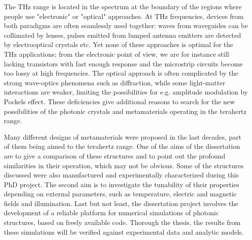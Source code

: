 \documentclass[letterpaper,12pt]{report}
\begin{document}
The THz range is located in the spectrum at the boundary of the regions where people use "electronic" or "optical" approaches. At THz frequencies, devices from both paradigms are often seamlessly used together: waves from waveguides can be collimated by lenses, pulses emitted from lumped antenna emitters are detected by electrooptical crystals etc. Yet none of these approaches is optimal for the THz applications; from the electronic point of view, we are for instance still lacking transistors with fast enough response and the microstrip circuits become too lossy at high frequencies. The optical approach is often complicated by the strong wave-optics phenomena such as diffraction, while some light-matter interactions are weaker, limiting the possibilities for e.g. amplitude modulation by Pockels effect. These deficiencies give additional reasons to search for the new possibilities of the photonic crystals and metamaterials operating in the terahertz range.



Many different designs of metamaterials  %
were proposed in the last decades, part of them being aimed to the terahertz range. %
One of the aims of the dissertation are to give a comparison of these structures and to point out the profound similarities in their operation, which may not be obvious.  Some of the structures discussed were also manufactured and experimentally characterized during this PhD project. 
The second aim is to investigate the tunability of their properties depending on external parameters, such as temperature, electric and magnetic fields and illumination. %
Last but not least, the dissertation project involves the development of a reliable platform for numerical simulations of photonic structures, based on freely available code. Thorough the thesis, the results from these simulations will be verified against experimental data and analytic models.
\end{document}
